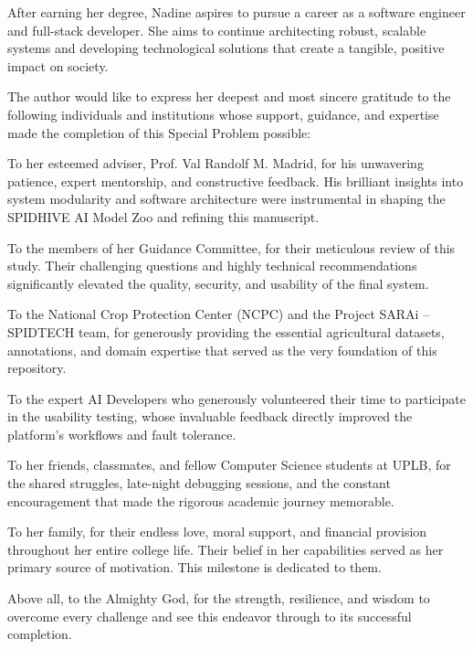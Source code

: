 \documentclass{icsthesis}
\begin{document}
\begin{frontmatter}
\begin{biosketch}
            After earning her degree, Nadine aspires to pursue a career as a software engineer and full-stack developer. She aims to continue architecting robust, scalable systems and developing technological solutions that create a tangible, positive impact on society.	
			
			\addauthorsignaturefield
		\end{biosketch}	
		
		\begin{acknowledgement}
			The author would like to express her deepest and most sincere gratitude to the following individuals and institutions whose support, guidance, and expertise made the completion of this Special Problem possible:

            To her esteemed adviser, Prof. Val Randolf M. Madrid, for his unwavering patience, expert mentorship, and constructive feedback. His brilliant insights into system modularity and software architecture were instrumental in shaping the SPIDHIVE AI Model Zoo and refining this manuscript.
            
            To the members of her Guidance Committee, for their meticulous review of this study. Their challenging questions and highly technical recommendations significantly elevated the quality, security, and usability of the final system.
            
            To the National Crop Protection Center (NCPC) and the Project SARAi – SPIDTECH team, for generously providing the essential agricultural datasets, annotations, and domain expertise that served as the very foundation of this repository.
            
            To the expert AI Developers who generously volunteered their time to participate in the usability testing, whose invaluable feedback directly improved the platform's workflows and fault tolerance.
            
            To her friends, classmates, and fellow Computer Science students at UPLB, for the shared struggles, late-night debugging sessions, and the constant encouragement that made the rigorous academic journey memorable.
            
            To her family, for their endless love, moral support, and financial provision throughout her entire college life. Their belief in her capabilities served as her primary source of motivation. This milestone is dedicated to them.
            
            Above all, to the Almighty God, for the strength, resilience, and wisdom to overcome every challenge and see this endeavor through to its successful completion.
		\end{acknowledgement}
		

\end{frontmatter}
\end{document}
